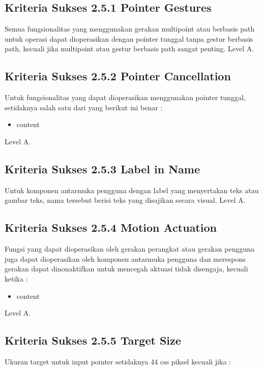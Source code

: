 \subsection{Kriteria Sukses 2.5.1 Pointer Gestures}
\label{sec:kriteria_2.5.1}
Semua fungsionalitas yang menggunakan gerakan multipoint atau berbasis path untuk operasi dapat dioperasikan dengan pointer tunggal tanpa gestur berbasis path, kecuali jika multipoint atau gestur berbasis path sangat penting.
Level A.

\subsection{Kriteria Sukses 2.5.2 Pointer Cancellation}
\label{sec:kriteria_2.5.2}
Untuk fungsionalitas yang dapat dioperasikan menggunakan pointer tunggal, setidaknya salah satu dari yang berikut ini benar :

\begin{itemize}
	\item content
\end{itemize}

Level A.

\subsection{Kriteria Sukses 2.5.3 Label in Name}
\label{sec:kriteria_2.5.3}
Untuk komponen antarmuka pengguna dengan label yang menyertakan teks atau gambar teks, nama tersebut berisi teks yang disajikan secara visual.
Level A.

\subsection{Kriteria Sukses 2.5.4 Motion Actuation}
\label{sec:kriteria_2.5.4}
Fungsi yang dapat dioperasikan oleh gerakan perangkat atau gerakan pengguna juga dapat dioperasikan oleh komponen antarmuka pengguna dan merespons gerakan dapat dinonaktifkan untuk mencegah aktuasi tidak disengaja, kecuali ketika :

\begin{itemize}
	\item content
\end{itemize}

Level A.

\subsection{Kriteria Sukses 2.5.5 Target Size}
\label{sec:kriteria_2.5.5}
Ukuran target untuk input pointer setidaknya 44 css piksel kecuali jika :

